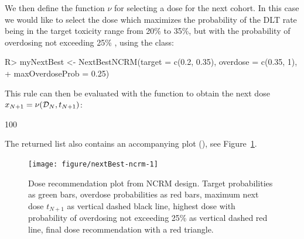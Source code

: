\documentclass[article]{jss}\usepackage[]{graphicx}\usepackage[]{color}
\begin{document}
We then define the function $\nu$ for selecting a dose for the next cohort. In this case we would like to select the dose which maximizes the probability of the DLT rate being in the target toxicity range from 20\% to 35\%, but with the probability of overdosing not exceeding 25\% \citep{Neuenschwander2008}, using the  class: 
\begin{Schunk}
\begin{Sinput}
R> myNextBest <- NextBestNCRM(target = c(0.2, 0.35), overdose = c(0.35, 1),
+                             maxOverdoseProb = 0.25)
\end{Sinput}
\end{Schunk}
This rule can then be evaluated with the function  to obtain the next dose $x_{N+1}=\nu({\cal D}_{N}, t_{N+1})$:
\begin{Schunk}
\begin{Soutput}
[1] 100
\end{Soutput}
\end{Schunk}
The returned list also contains an accompanying plot (), see Figure~\ref{fig:nextBest-ncrm}.
\begin{Schunk}
\begin{figure}

{\centering \texttt{[image: figure/nextBest-ncrm-1]} 

}

\caption[Dose recommendation plot from NCRM design]{Dose recommendation plot from NCRM design. Target probabilities as green bars, overdose probabilities as red bars, maximum next dose $t_{N+1}$ as vertical dashed black line, highest dose with probability of overdosing not exceeding 25\% as vertical dashed red line, final dose recommendation with a red triangle.}\label{fig:nextBest-ncrm}
\end{figure}
\end{Schunk}
\end{document}

